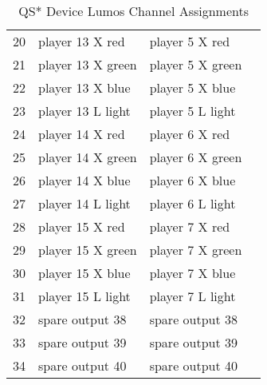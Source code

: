 \documentclass[letterpaper,twoside,onecolumn,openright,final]{memoir}
\begin{document}
\begin{QS}
\begin{table}
\begin{QS*}
\begin{center}
\begin{tabular}{rlll}
				20& player 13 X red  & player 5 X red \\
				21& player 13 X green  & player 5 X green \\
				22& player 13 X blue  & player 5 X blue \\
				23& player 13 L light  & player 5 L light \\
				24& player 14 X red  & player 6 X red \\
				25& player 14 X green  & player 6 X green \\
				26& player 14 X blue  & player 6 X blue \\
				27& player 14 L light  & player 6 L light \\
				28& player 15 X red  & player 7 X red \\
				29& player 15 X green  & player 7 X green \\
				30& player 15 X blue  & player 7 X blue \\
				31& player 15 L light  & player 7 L light \\
				32& spare output 38 & spare output 38 \\
				33& spare output 39 & spare output 39 \\
				34& spare output 40 & spare output 40 \\\bottomrule
			\end{tabular}
			\caption{QS* Device Lumos Channel Assignments\label{tbl:qslumoschannels}}
		\end{center}
	\end{QS*}
\end{table}
				

\end{QS}
\end{document}

